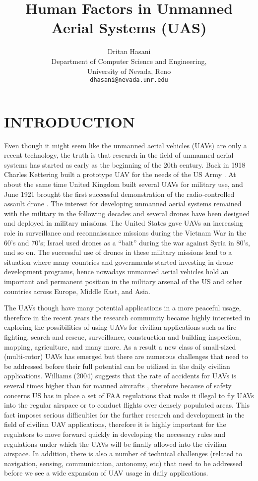 \documentclass[12pt, letterpaper, oneside]{article}
\title{\textbf{Human Factors in Unmanned Aerial Systems (UAS)}}
\author{Dritan Hasani\\
		Department of Computer Science and Engineering,\\
		University of Nevada, Reno\\
		\texttt{dhasani@nevada.unr.edu}}
\date{}
\begin{document}
 
\begin{titlepage}
\maketitle
\thispagestyle{empty}
\end{titlepage}
 
\section{INTRODUCTION}
Even though it might seem like the unmanned aerial vehicles (UAVs) are only a recent technology, the truth is that research in the field of unmanned aerial systems has started as early as the beginning of the 20th century. Back in 1918 Charles Kettering built a prototype UAV for the needs of the US Army \cite{10}. At about the same time United Kingdom built several UAVs for military use, and June 1921 brought the first successful demonstration of the radio-controlled assault drone \cite{16}. The interest for developing unmanned aerial systems remained with the military in the following decades and several drones have been designed and deployed in military missions. The United States gave UAVs an increasing role in surveillance and reconnaissance  missions during the Vietnam War in the 60's and 70's; Israel used drones as a “bait” during the war against Syria in 80's, and so on. The successful use of drones in these military missions lead to a situation where many countries and governments started investing in drone development programs, hence nowadays unmanned aerial vehicles hold an important and permanent position in the military arsenal of the US and other countries across Europe, Middle East, and Asia.
  
The UAVs though have many potential applications in a more peaceful usage, therefore in the recent years the research community became highly  interested in exploring the possibilities of using UAVs for civilian applications such as fire fighting, search and rescue, surveillance, construction and building inspection, mapping, agriculture, and many more. As a result a new class of small-sized (multi-rotor) UAVs has emerged but there are numerous challenges that need to be addressed before their full potential can be utilized in the daily civilian applications. Williams (2004) suggests that the rate of accidents for UAVs is several times higher than for manned aircrafts \cite{19}, therefore because of safety concerns US has in place a set of FAA regulations that make it illegal to fly UAVs into the regular airspace or to conduct  flights over densely populated areas. This fact imposes serious difficulties for the further research and development in the field of civilian UAV applications, therefore it is highly important for the regulators to move forward quickly in developing the necessary rules and regulations under which the UAVs will be finally allowed into the civilian airspace. In addition, there is also a number of technical challenges (related to navigation, sensing, communication, autonomy, etc) that need to be addressed before we see a wide expansion of UAV usage in daily applications.
 
\end{document}
